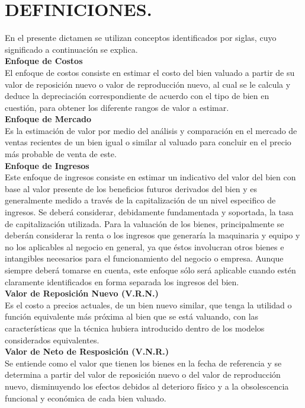 \chapter{DEFINICIONES.} %
En el presente dictamen se utilizan conceptos identificados por siglas, cuyo significado a continuación se explica. \\[6mm]
\textbf{Enfoque de Costos} \\ 
El enfoque de costos consiste en estimar el costo del bien valuado a partir de su valor de reposición nuevo o valor de reproducción nuevo, al cual se le calcula y deduce la depreciación correspondiente de acuerdo con el tipo de bien en cuestión, para obtener los diferente rangos de valor a estimar. \\[6mm]
\textbf{Enfoque de Mercado} \\ 
Es la estimación de valor por medio del análisis y comparación en el mercado de ventas recientes de un bien igual o similar al valuado para concluir en el precio más probable de venta de este. \\[6mm]
\textbf{Enfoque de Ingresos} \\ 
Este enfoque de ingresos consiste en estimar un indicativo del valor del bien con base al valor presente de los beneficios futuros derivados del bien y es generalmente medido a través de la capitalización de un nivel especifico de ingresos. 
Se deberá considerar, debidamente fundamentada y soportada, la tasa de capitalización utilizada.
Para la valuación de los bienes, principalmente se deberán considerar la renta o los ingresos que generaría la maquinaria y equipo y no los aplicables al negocio en general, ya que éstos involucran otros bienes e intangibles necesarios para el funcionamiento del negocio o empresa. 
Aunque siempre deberá tomarse en cuenta, este enfoque sólo será aplicable cuando estén claramente identificados en forma separada los ingresos del bien. \\[6mm]
\textbf{Valor de Reposición Nuevo (V.R.N.)} \\ 
Es el costo a precios actuales, de un bien nuevo similar, que tenga la utilidad o función equivalente más próxima al bien que se está valuando, con las características que la  técnica  hubiera  introducido dentro de los modelos considerados equivalentes. \\[6mm]
\textbf{Valor de Neto de Resposición (V.N.R.)} \\ 
Se entiende como el valor que tienen los bienes en la fecha de referencia y se determina a partir del valor de reposición nuevo o del valor de reproducción nuevo, disminuyendo los efectos debidos al deterioro físico y a la obsolescencia funcional y económica de cada bien valuado. \\[6mm] 
